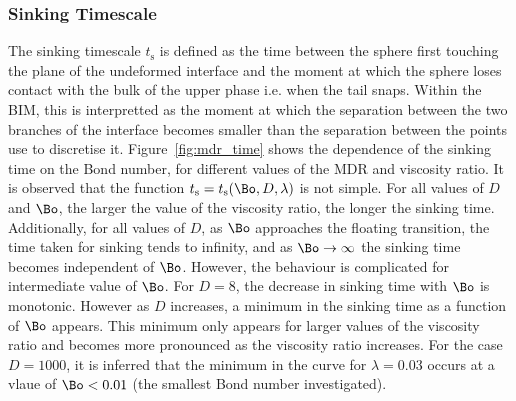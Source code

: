{\subsubsection{Sinking Timescale}
\label{subsubsec:sink_time}

The sinking timescale $t_{\text{s}}$ is defined as the time between the sphere first touching the plane of the undeformed interface and the moment at which the sphere loses contact with the bulk of the upper phase i.e. when the tail snaps. Within the BIM, this is interpretted as the moment at which the separation between the two branches of the interface becomes smaller than the separation between the points use to discretise it. Figure~\ref{fig:mdr_time} shows the dependence of the sinking time on the Bond number, for different values of the MDR and viscosity ratio. It is observed that the function $t_{\text{s}} = t_{\text{s}}(\Bo, D, \lambda)$ is not simple. For all values of $D$ and $\Bo$, the larger the value of the viscosity ratio, the longer the sinking time. Additionally, for all values of $D$, as $\Bo$ approaches the floating transition, the time taken for sinking tends to infinity, and as $\Bo \to \infty$ the sinking time becomes independent of $\Bo$. However, the behaviour is complicated for intermediate value of $\Bo$. For $D = 8$, the decrease in sinking time with $\Bo$ is monotonic. However as $D$ increases, a minimum in the sinking time as a function of $\Bo$ appears. This minimum only appears for larger values of the viscosity ratio and becomes more pronounced as the viscosity ratio increases. For the case $D = 1000$, it is inferred that the minimum in the curve for $\lambda = 0.03$ occurs at a vlaue of $\Bo < 0.01$ (the smallest Bond number investigated).

    \begin{figure}
      \centering
      \begin{subfigure}[b]{0.45\textwidth}
        \resizebox{\textwidth}{!}{\Large }
        \caption{}
        \label{fig:mdr=8_time}
      \end{subfigure}
      ~
      \begin{subfigure}[b]{0.45\textwidth}
        \resizebox{\textwidth}{!}{\Large }
        \caption{}
        \label{fig:mdr=50_time}
      \end{subfigure}
      

\end{figure}}
